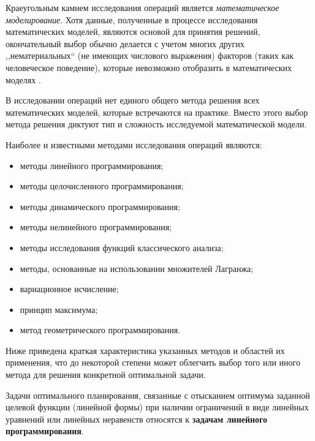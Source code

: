 Краеугольным камнем исследования операций является \textsl{математическое
моделирование}. Хотя данные, полученные в процессе исследования
математических моделей, являются основой для принятия решений,
окончательный выбор обычно делается с учетом многих других
,,нематериальных`` (не имеющих числового выражения) факторов (таких как
человеческое поведение), которые невозможно отобразить в
математических моделях \cite{taxa}.

В исследовании операций нет единого общего метода решения всех
математических моделей, которые встречаются на практике. Вместо этого
выбор метода решения диктуют тип и сложность исследуемой
математической модели.

Наиболее и известными методами исследования операций являются:

\begin{itemize}

\item методы линейного программирования;

\item методы целочисленного программирования;

\item методы динамического программирования;

\item методы нелинейного программирования;

\item методы исследования функций классического анализа;

\item методы, основанные на использовании множителей Лагранжа;

\item вариационное исчисление;

\item принцип максимума; 

\item метод геометрического программирования.

\end{itemize}

Ниже приведена краткая характеристика указанных методов и областей их
применения, что до некоторой степени может облегчить выбор того или
иного метода для решения конкретной оптимальной задачи.

Задачи оптимального планирования, связанные с отысканием оптимума заданной целевой функции (линейной формы) при наличии ограничений в виде линейных уравнений или линейных неравенств относятся к \textbf{задачам линейного программирования}.

